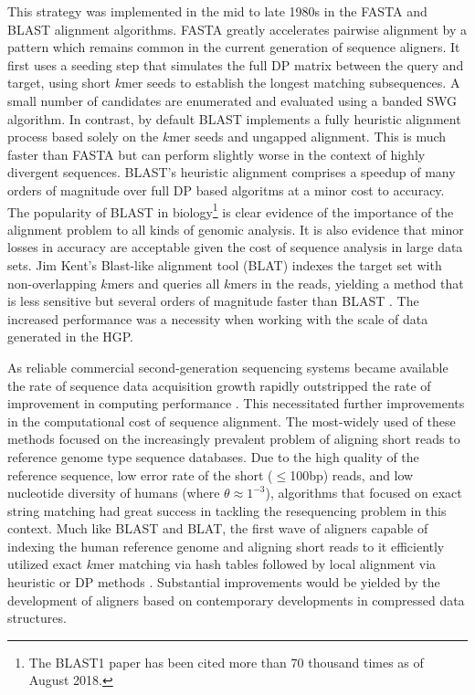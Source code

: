 This strategy was implemented in the mid to late 1980s in the FASTA \cite{pearson1988improved} and BLAST \cite{altschul1990basic} alignment algorithms.
FASTA greatly accelerates pairwise alignment by a pattern which remains common in the current generation of sequence aligners.
It first uses a seeding step that simulates the full DP matrix between the query and target, using short $k$mer seeds to establish the longest matching subsequences.
A small number of candidates are enumerated and evaluated using a banded SWG algorithm.
In contrast, by default BLAST implements a fully heuristic alignment process based solely on the $k$mer seeds and ungapped alignment.
This is much faster than FASTA but can perform slightly worse in the context of highly divergent sequences.
BLAST's heuristic alignment comprises a speedup of many orders of magnitude over full DP based algoritms at a minor cost to accuracy.
The popularity of BLAST in biology\footnote{The BLAST1 paper has been cited more than 70 thousand times as of August 2018.} is clear evidence of the importance of the alignment problem to all kinds of genomic analysis.
It is also evidence that minor losses in accuracy are acceptable given the cost of sequence analysis in large data sets.
Jim Kent's Blast-like alignment tool (BLAT) indexes the target set with non-overlapping $k$mers and queries all $k$mers in the reads, yielding a method that is less sensitive but several orders of magnitude faster than BLAST \cite{kent2002blat}.
The increased performance was a necessity when working with the scale of data generated in the HGP.

As reliable commercial second-generation sequencing systems became available the rate of sequence data acquisition growth rapidly outstripped the rate of improvement in computing performance \cite{leinonen2010sequence,kodama2011sequence}.
This necessitated further improvements in the computational cost of sequence alignment.
The most-widely used of these methods focused on the increasingly prevalent problem of aligning short reads to reference genome type sequence databases.
Due to the high quality of the reference sequence, low error rate of the short ($\leq$100bp) reads, and low nucleotide diversity of humans (where $\theta \approx 1^{-3}$), algorithms that focused on exact string matching had great success in tackling the resequencing problem in this context.
Much like BLAST and BLAT, the first wave of aligners capable of indexing the human reference genome and aligning short reads to it efficiently utilized exact $k$mer matching via hash tables followed by local alignment via heuristic or DP methods \cite{li2008soap,lee2014mosaik,li2008mapping}.
Substantial improvements would be yielded by the development of aligners based on contemporary developments in compressed data structures.

